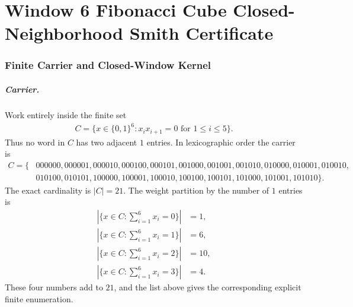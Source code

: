 \chapter{Window 6 Fibonacci Cube Closed-Neighborhood Smith Certificate}\label{ch:window6-fibonacci-cube-closed-neighborhood-smith-certificate}

\subsection{Finite Carrier and Closed-Window Kernel}\label{sec:window6-fibonacci-cube-carrier-kernel}

\paragraph{Carrier.} Work entirely inside the finite set
$$\begin{aligned}
C=\{x\in\{0,1\}^6: x_i x_{i+1}=0\text{ for }1\le i\le 5\}.
\end{aligned}$$
Thus no word in $C$ has two adjacent $1$ entries. In lexicographic order the carrier is
$$\begin{aligned}
C=\{&000000,000001,000010,000100,000101,001000,001001,001010,010000,010001,010010,\\
&010100,010101,100000,100001,100010,100100,100101,101000,101001,101010\}.
\end{aligned}$$
The exact cardinality is $|C|=21$. The weight partition by the number of $1$ entries is
$$\begin{aligned}
|\{x\in C:\sum_{i=1}^6 x_i=0\}|&=1,\\
|\{x\in C:\sum_{i=1}^6 x_i=1\}|&=6,\\
|\{x\in C:\sum_{i=1}^6 x_i=2\}|&=10,\\
|\{x\in C:\sum_{i=1}^6 x_i=3\}|&=4.
\end{aligned}$$
These four numbers add to $21$, and the list above gives the corresponding explicit finite enumeration.

